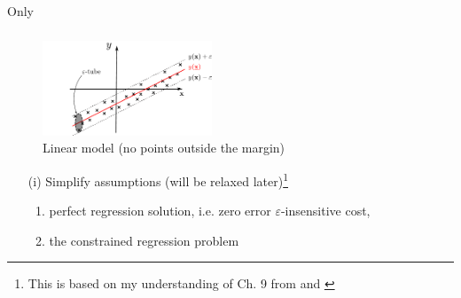 \begin{frame}{Only}\frametitle{\subsubsecname}

\begin{figure}[h]
     \centering
	 \includegraphics[width=0.45\textwidth]{img/regression_1d_linear_margin}%
     \caption{Linear model (no points outside the margin)}
	 \label{fig:model_margin}
\end{figure}

\slidesonly{\vspace{-5mm}}

\begin{itemize}
\item[(i)]
Simplify assumptions (will be relaxed later)\footnote{This is based on my understanding of Ch. 9 from \citep{scholkopf2001learning} and \citep{scholkopf2000new}}

\begin{enumerate}
    \item<only@1-> perfect regression solution, i.e. zero error $\varepsilon$-insensitive cost,
    \item<only@2,3> the constrained regression problem\\
\end{enumerate}
\end{itemize}
    
\end{frame}



